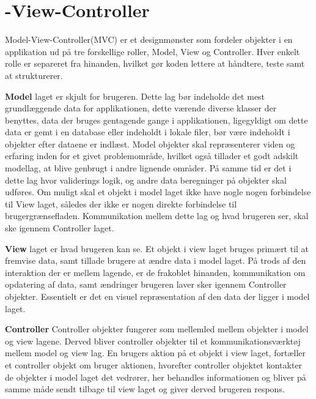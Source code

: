 \section{-View-Controller}
Model-View-Controller(MVC) er et designmønster som fordeler 
objekter i en applikation ud på tre forskellige roller, 
Model, View og Controller. Hver enkelt rolle er separeret fra 
hinanden, hvilket gør koden lettere at håndtere, teste samt 
at strukturerer.

\textbf{Model} laget er skjult for brugeren. Dette lag bør 
indeholde det mest grundlæggende data for applikationen, 
dette værende diverse klasser der benyttes, data der bruges 
gentagende gange i applikationen, ligegyldigt om dette data 
er gemt i en database eller indeholdt i lokale filer, bør 
være indeholdt i objekter efter dataene er indlæst. Model 
objekter skal repræsenterer viden og erfaring inden for et 
givet problemområde, hvilket også tillader et godt adskilt 
modellag, at blive genbrugt i andre lignende områder. På 
samme tid er det i dette lag hvor validerings logik, og andre 
data beregninger på objekter skal udføres. Om muligt skal 
et objekt i model laget ikke have nogle nogen forbindelse til 
View laget, således der ikke er nogen direkte forbindelse til 
brugergrænsefladen. Kommunikation mellem dette lag og hvad 
brugeren ser, skal ske igennem Controller laget.

\textbf{View} laget er hvad brugeren kan se. Et objekt i view 
laget bruges primært til at fremvise data, samt tillade 
brugere at ændre data i model laget. På trods af den 
interaktion der er mellem lagende, er de frakoblet hinanden, 
kommunikation om opdatering af data, samt ændringer brugeren 
laver sker igennem Controller objekter. Essentielt er det en 
visuel repræsentation af den data der ligger i model laget.

\textbf{Controller}
Controller objekter fungerer som mellemled mellem objekter i 
model og view lagene. Derved bliver controller objekter til 
et kommunikationsværktøj mellem model og view lag. En brugers 
aktion på et objekt i view laget, fortæller et controller 
objekt om bruger aktionen, hvorefter controller objektet 
kontakter de objekter i model laget det vedrører, her 
behandles informationen og bliver på samme måde sendt tilbage 
til view laget og giver derved brugeren respons.